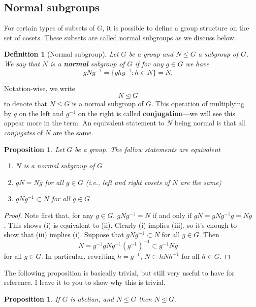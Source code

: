 \documentclass[12pt]{article}
\numberwithin{equation}{subsection}
\newtheorem{prop}[subsection]{Proposition}
\newtheorem{defn}[subsection]{Definition}
\theoremstyle{note}
\newcommand{\nrml}{\trianglelefteq}
\begin{document}
\subsection{Normal subgroups}

For certain types of subsets of $G$, it is possible to define a group structure on the set of cosets. These subsets are called normal subgroups as we discuss below.

\begin{defn}[Normal subgroup]
	Let $G$ be a group and $N\leq G$ a subgroup of $G$. We say that $N$ is a \textbf{normal} subgroup of $G$ if for any $g\in G$ we have \begin{equation} gNg^{-1}=\{ghg^{-1} : h\in N\}=N.\end{equation}
\end{defn} 
Notation-wise, we write \begin{equation} N\nrml G\end{equation} to denote that $N\leq G$ is a normal subgroup of $G$. This operation of multiplying by $g$ on the left and $g^{-1}$ on the right is called \textbf{conjugation}---we will see this appear more in the term. An equivalent statement to $N$ being normal is that all \textit{conjugates} of $N$ are the same. 

\begin{prop} Let $G$ be a group. The follow statements are equivalent
\begin{enumerate}[label=(\roman*)]
	\item $N$ is a normal subgroup of $G$
	\item $gN=Ng$ for all $g\in G$ (i.e., left and right cosets of $N$ are the same)
	\item $gNg^{-1}\subset N$ for all $g\in G$
\end{enumerate}
\end{prop}

\begin{proof} Note first that, for any $g\in G$, $gNg^{-1} =N$ if and only if  $gN=gNg^{-1}g=Ng$. This shows (i) is equivalent to (ii). Clearly (i) implies (iii), so it's enough to show that (iii) implies (i). Suppose that $gNg^{-1}\subset N$ for all $g\in G$. Then \[ N = g^{-1} gNg^{-1} (g^{-1})^{-1}\subset g^{-1} N g\] for all $g\in G$. In particular, rewriting $h=g^{-1}$, $N\subset hNh^{-1}$ for all $h\in G$. \end{proof} 

The following proposition is basically trivial, but still very useful to have for reference. I leave it to you to show why this is trivial.
\begin{prop} If $G$ is abelian, and $N\leq G$ then $N\nrml G$.
\end{prop}
\end{document}
